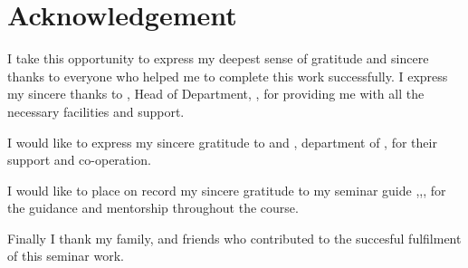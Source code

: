 \chapter*{\centering Acknowledgement}%
%


I take this opportunity to express my deepest sense of gratitude and sincere
thanks to everyone who helped me to complete this work successfully. I express
my sincere thanks to \textbf{ \hod}, Head of Department, \dept,
\college\hspace*{2pt} \collegeplace \hspace*{2pt} for providing me with all the
necessary facilities and support.\par

I would like to express my sincere gratitude to \textbf{\semcordinatorA} and
\textbf{\semcordinatorB}, \hspace*{2pt} department of \hspace*{2pt} \dept,
\hspace*{2pt} \college \hspace*{2pt} \collegeplace \hspace*{2pt} for their
support and co-operation.

\noindent I would like to place on record my sincere gratitude to my seminar guide \textbf{\guide},\hspace*{2pt}\guidedes,\hspace*{2pt}\dept,\hspace*{2pt}\college \hspace*{2pt} for the guidance and mentorship throughout the course.

Finally I thank my family, and friends who contributed to the succesful
fulfilment of this seminar work.

\vspace*{30pt}
\begin{flushright}
	\textbf{\author}
\end{flushright}
\thispagestyle{plain}
